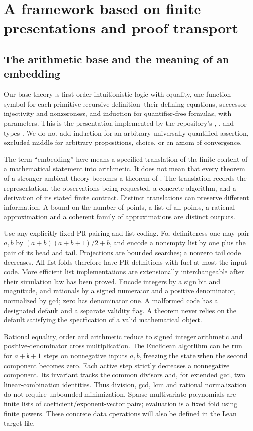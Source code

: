 \section{A framework based on finite presentations and proof transport}
\label{sec:framework}

\subsection{The arithmetic base and the meaning of an embedding}

Our base theory is first-order intuitionistic logic with equality,
one function symbol for each primitive recursive definition, their
defining equations, successor injectivity and nonzeroness, and induction
for quantifier-free formulas, with parameters. This is the presentation
implemented by the repository's , , 
and  types \cite{PRSource,DeductionSource}. We do not add
induction for an arbitrary universally quantified assertion, excluded
middle for arbitrary propositions, choice, or an axiom of convergence.

The term ``embedding'' here means a specified translation of the finite
content of a mathematical statement into arithmetic. It does not mean
that every theorem of a stronger ambient theory becomes a theorem of
\ipra. The translation records the representation, the observations
being requested, a concrete algorithm, and a derivation of its stated
finite contract. Distinct translations can preserve different information.
A bound on the number of points, a list of all points, a rational
approximation and a coherent family of approximations are distinct outputs.

Use any explicitly fixed PR pairing and list coding. For definiteness
one may pair $a,b$ by $(a+b)(a+b+1)/2+b$, and encode a nonempty list
by one plus the pair of its head and tail. Projections are bounded
searches; a nonzero tail code decreases. All list folds therefore have
PR definitions with fuel at most the input code. More efficient list
implementations are extensionally interchangeable after their simulation
law has been proved. Encode integers by a sign bit and magnitude, and
rationals by a signed numerator and a positive denominator, normalized
by gcd; zero has denominator one. A malformed code has a designated
default and a separate validity flag. A theorem never relies on the
default satisfying the specification of a valid mathematical object.

Rational equality, order and arithmetic reduce to signed integer
arithmetic and positive-denominator cross multiplication. The Euclidean
algorithm can be run for $a+b+1$ steps on nonnegative inputs $a,b$,
freezing the state when the second component becomes zero. Each active
step strictly decreases a nonnegative component. Its invariant tracks
the common divisors and, for extended gcd, two linear-combination
identities. Thus division, gcd, lcm and rational normalization do not
require unbounded minimization. Sparse multivariate polynomials are
finite lists of coefficient/exponent-vector pairs; evaluation is a fixed
fold using finite powers. These concrete data operations will also be
defined in the Lean target file.

